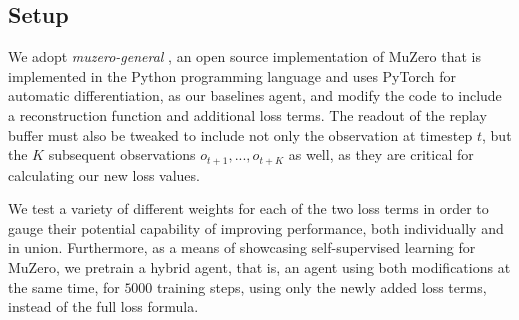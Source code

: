 \subsection{Setup}
We adopt \textit{muzero-general} \cite{muzero-general}, an open source implementation of MuZero that is implemented in the Python programming language and uses PyTorch for automatic differentiation, as our baselines agent, and modify the code to include a reconstruction function and additional loss terms. The readout of the replay buffer must also be tweaked to include not only the observation at timestep $t$, but the $K$ subsequent observations $o_{t+1}, ..., o_{t+K}$ as well, as they are critical for calculating our new loss values.

We test a variety of different weights for each of the two loss terms in order to gauge their potential capability of improving performance, both individually and in union. Furthermore, as a means of showcasing self-supervised learning for MuZero, we pretrain a hybrid agent, that is, an agent using both modifications at the same time, for $5000$ training steps, using only the newly added loss terms, instead of the full loss formula.

